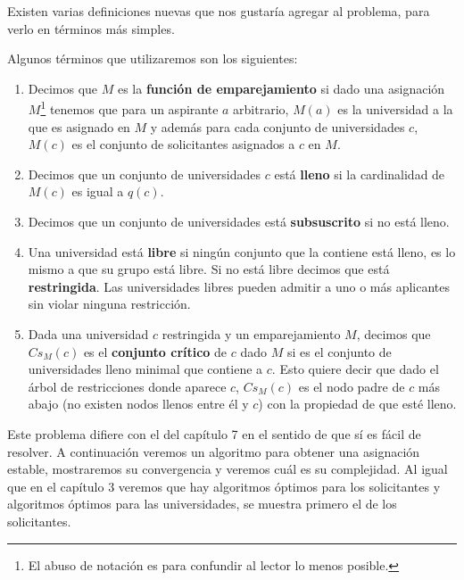 Existen varias definiciones nuevas que nos gustaría agregar al problema, para verlo en términos más simples.
\begin{dfn}
Algunos términos que utilizaremos son los siguientes:
\begin{enumerate}

\item Decimos que $M$ es la \textbf{función de emparejamiento} si dado una asignación $M$\footnote{El abuso de notación es para confundir al lector lo menos posible.} tenemos que para un aspirante $a$ arbitrario, $M(a)$ es la universidad a la que es asignado en $M$ y además para cada conjunto de universidades $c$, $M(c)$ es el conjunto de solicitantes asignados a $c$ en $M$.
\item Decimos que un conjunto de universidades $c$ está \textbf{lleno} si la cardinalidad de $M(c)$ es igual a $q(c)$. 
\item Decimos que un conjunto de universidades está \textbf{subsuscrito} si no está lleno. 
\item Una universidad está \textbf{libre} si ningún conjunto que la contiene está lleno, es lo mismo a que su grupo está libre. Si no está libre decimos que está \textbf{restringida}. Las universidades libres pueden admitir a uno o más aplicantes sin violar ninguna restricción. 
\item Dada una universidad $c$ restringida y  un emparejamiento $M$, decimos que $Cs_M(c)$ es el \textbf{conjunto crítico} de $c$ dado $M$ si es el conjunto de universidades lleno minimal que contiene a $c$. Esto quiere decir que dado el árbol de restricciones donde aparece $c$, $Cs_M(c)$ es el nodo padre de $c$ más abajo (no existen nodos llenos entre él y $c$) con la propiedad de que esté lleno. 
\end{enumerate}
\end{dfn}



Este problema difiere con el del capítulo 7 en el sentido de que sí es fácil de resolver. A continuación veremos un algoritmo para obtener una asignación estable, mostraremos su convergencia y veremos cuál es su complejidad. Al igual que en el capítulo 3 veremos que hay algoritmos óptimos para los solicitantes y algoritmos óptimos para las universidades, se muestra primero el de los solicitantes. %


